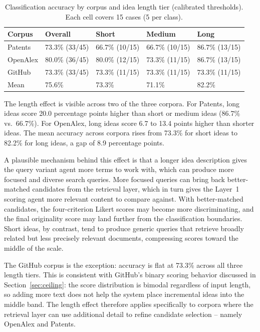 \begin{table}[width=\textwidth,cols=5,pos=ht]
    \caption{Classification accuracy by corpus and idea length tier (calibrated thresholds). Each cell covers 15 cases (5 per class).}
    \label{tab:length}
    \begin{tabular*}{\textwidth}{@{\extracolsep{\fill}}lllll@{}}
        \toprule
        Corpus   & Overall        & Short          & Medium         & Long           \\
        \midrule
        Patents  & 73.3\% (33/45) & 66.7\% (10/15) & 66.7\% (10/15) & 86.7\% (13/15) \\
        OpenAlex & 80.0\% (36/45) & 80.0\% (12/15) & 73.3\% (11/15) & 86.7\% (13/15) \\
        GitHub   & 73.3\% (33/45) & 73.3\% (11/15) & 73.3\% (11/15) & 73.3\% (11/15) \\
        \midrule
        Mean     & 75.6\%         & 73.3\%         & 71.1\%         & 82.2\%         \\
        \bottomrule
    \end{tabular*}
\end{table}
 
The length effect is visible across two of the three corpora. For Patents, long ideas score 20.0 percentage points higher than short or medium ideas (86.7\% vs.\ 66.7\%). For OpenAlex, long ideas score 6.7 to 13.4 points higher than shorter ideas. The mean accuracy across corpora rises from 73.3\% for short ideas to 82.2\% for long ideas, a gap of 8.9 percentage points.
 
A plausible mechanism behind this effect is that a longer idea description gives the query variant agent more terms to work with, which can produce more focused and diverse search queries. More focused queries can bring back better-matched candidates from the retrieval layer, which in turn gives the Layer~1 scoring agent more relevant content to compare against. With better-matched candidates, the four-criterion Likert scores may become more discriminating, and the final originality score may land further from the classification boundaries. Short ideas, by contrast, tend to produce generic queries that retrieve broadly related but less precisely relevant documents, compressing scores toward the middle of the scale.
 
The GitHub corpus is the exception: accuracy is flat at 73.3\% across all three length tiers. This is consistent with GitHub's binary scoring behavior discussed in Section~\ref{sec:ceiling}: the score distribution is bimodal regardless of input length, so adding more text does not help the system place incremental ideas into the middle band. The length effect therefore applies specifically to corpora where the retrieval layer can use additional detail to refine candidate selection -- namely OpenAlex and Patents.
 

